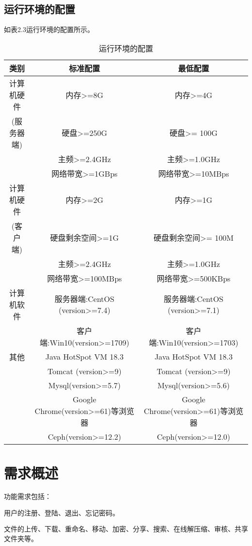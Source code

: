 \subsection{运行环境的配置}
如表2.3运行环境的配置所示。
\begin{table}[htbp]
\centering
\caption{运行环境的配置} \label{tab:operation-environment}
\begin{tabular}{|c|c|c|}
    \hline
    类别 & 标准配置 & 最低配置 \\
    \hline
    计算机硬件 & 内存>=8G & 内存>=4G \\
    (服务器端)         & 硬盘>=250G & 硬盘>= 100G \\
             & 主频>=2.4GHz & 主频>=1.0GHz \\
             & 网络带宽>=1GBps & 网络带宽>=10MBps \\ 
    \hline
    计算机硬件 & 内存>=2G & 内存>=1G \\
    (客户端)         & 硬盘剩余空间>=1G & 硬盘剩余空间>= 100M \\
             & 主频>=2.4GHz & 主频>=1.0GHz \\
             & 网络带宽>=100MBps & 网络带宽>=500KBps \\ 
    \hline
    计算机软件 & 服务器端:CentOS (version>=7.4) & 服务器端:CentOS (version>=7.1)\\
             & 客户端:Win10(version>=1709) & 客户端:Win10(version>=1703)\\
    \hline
    其他 & Java HotSpot VM 18.3 &  Java HotSpot VM 18.3\\
        & Tomcat (version>=9) &  Tomcat (version>=9)\\ 
        & Mysql(version>=5.7) &  Mysql(version>=5.6)\\
        & Google Chrome(version>=61)等浏览器&  Google Chrome(version>=61)等浏览器\\
        & Ceph(version>=12.2) &  Ceph(version>=12.0)\\
    \hline
\end{tabular}
\end{table}

\section{需求概述}
功能需求包括： 

用户的注册、登陆、退出、忘记密码。

文件的上传、下载、重命名、移动、加密、分享、搜索、在线解压缩、审核、共享文件夹等。

